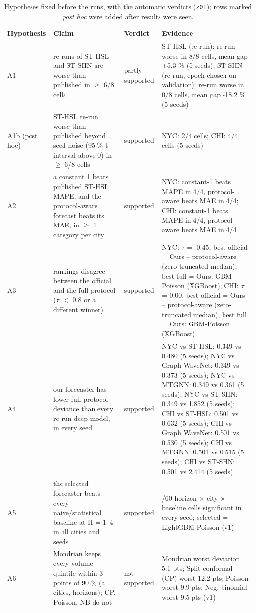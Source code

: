 \documentclass[11pt]{article}
\begin{document}
\begin{table}[H]\centering\tiny\setlength{\tabcolsep}{3pt}
\caption{Hypotheses fixed before the runs, with the automatic verdicts (\texttt{z01}); rows marked \emph{post hoc} were added after results were seen.}\label{tab:s6}
\begin{tabularx}{\linewidth}{>{\raggedright\arraybackslash}p{1.6cm}>{\raggedright\arraybackslash}X>{\raggedright\arraybackslash}p{1.7cm}>{\raggedright\arraybackslash}X}\toprule
Hypothesis & Claim & Verdict & Evidence\\\midrule
A1 & re-runs of ST-HSL and ST-SHN are worse than published in $\geq$ 6/8 cells & partly supported & ST-HSL (re-run): re-run worse in 8/8 cells, mean gap +5.3 \% (5 seeds); ST-SHN (re-run, epoch chosen on validation): re-run worse in 0/8 cells, mean gap -18.2 \% (5 seeds) \\
A1b (post hoc) & ST-HSL re-run worse than published beyond seed noise (95 \% t-interval above 0) in $\geq$ 6/8 cells & supported & NYC: 2/4 cells; CHI: 4/4 cells (5 seeds) \\
A2 & a constant 1 beats published ST-HSL MAPE, and the protocol-aware forecast beats its MAE, in $\geq$ 1 category per city & supported & NYC: constant-1 beats MAPE in 4/4, protocol-aware beats MAE in 4/4; CHI: constant-1 beats MAPE in 4/4, protocol-aware beats MAE in 4/4 \\
A3 & rankings disagree between the official and the full protocol ($\tau$ $<$ 0.8 or a different winner) & supported & NYC: $\tau$ = -0.45, best official = Ours -- protocol-aware (zero-truncated median), best full = Ours: GBM-Poisson (XGBoost); CHI: $\tau$ = 0.00, best official = Ours -- protocol-aware (zero-truncated median), best full = Ours: GBM-Poisson (XGBoost) \\
A4 & our forecaster has lower full-protocol deviance than every re-run deep model, in every seed & supported & NYC vs ST-HSL: 0.349 vs 0.480 (5 seeds); NYC vs Graph WaveNet: 0.349 vs 0.373 (5 seeds); NYC vs MTGNN: 0.349 vs 0.361 (5 seeds); NYC vs ST-SHN: 0.349 vs 1.852 (5 seeds); CHI vs ST-HSL: 0.501 vs 0.632 (5 seeds); CHI vs Graph WaveNet: 0.501 vs 0.530 (5 seeds); CHI vs MTGNN: 0.501 vs 0.515 (5 seeds); CHI vs ST-SHN: 0.501 vs 2.414 (5 seeds) \\
A5 & the selected forecaster beats every naive/statistical baseline at H = 1--4 in all cities and seeds & supported & 60/60 horizon $\times$ city $\times$ baseline cells significant in every seed; selected = LightGBM-Poisson (v1) \\
A6 & Mondrian keeps every volume quintile within 3 points of 90 \% (all cities, horizons); CP, Poisson, NB do not & not supported & Mondrian worst deviation 5.1 pts; Split conformal (CP) worst 12.2 pts; Poisson worst 9.9 pts; Neg. binomial worst 9.5 pts (v1) \\

\end{tabularx}
\end{table}
\end{document}
